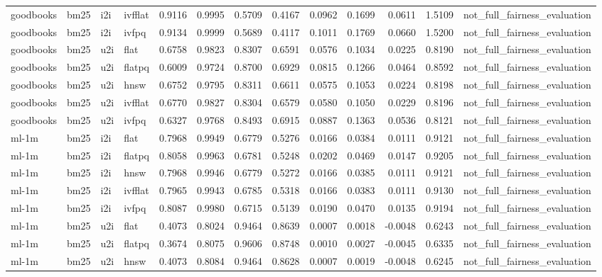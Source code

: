 \begin{tabular}{llllrrrrrrrrl}
goodbooks & bm25 & i2i & ivfflat & 0.9116 & 0.9995 & 0.5709 & 0.4167 & 0.0962 & 0.1699 & 0.0611 & 1.5109 & not_full_fairness_evaluation \\
goodbooks & bm25 & i2i & ivfpq & 0.9134 & 0.9999 & 0.5689 & 0.4117 & 0.1011 & 0.1769 & 0.0660 & 1.5200 & not_full_fairness_evaluation \\
goodbooks & bm25 & u2i & flat & 0.6758 & 0.9823 & 0.8307 & 0.6591 & 0.0576 & 0.1034 & 0.0225 & 0.8190 & not_full_fairness_evaluation \\
goodbooks & bm25 & u2i & flatpq & 0.6009 & 0.9724 & 0.8700 & 0.6929 & 0.0815 & 0.1266 & 0.0464 & 0.8592 & not_full_fairness_evaluation \\
goodbooks & bm25 & u2i & hnsw & 0.6752 & 0.9795 & 0.8311 & 0.6611 & 0.0575 & 0.1053 & 0.0224 & 0.8198 & not_full_fairness_evaluation \\
goodbooks & bm25 & u2i & ivfflat & 0.6770 & 0.9827 & 0.8304 & 0.6579 & 0.0580 & 0.1050 & 0.0229 & 0.8196 & not_full_fairness_evaluation \\
goodbooks & bm25 & u2i & ivfpq & 0.6327 & 0.9768 & 0.8493 & 0.6915 & 0.0887 & 0.1363 & 0.0536 & 0.8121 & not_full_fairness_evaluation \\
ml-1m & bm25 & i2i & flat & 0.7968 & 0.9949 & 0.6779 & 0.5276 & 0.0166 & 0.0384 & 0.0111 & 0.9121 & not_full_fairness_evaluation \\
ml-1m & bm25 & i2i & flatpq & 0.8058 & 0.9963 & 0.6781 & 0.5248 & 0.0202 & 0.0469 & 0.0147 & 0.9205 & not_full_fairness_evaluation \\
ml-1m & bm25 & i2i & hnsw & 0.7968 & 0.9946 & 0.6779 & 0.5272 & 0.0166 & 0.0385 & 0.0111 & 0.9121 & not_full_fairness_evaluation \\
ml-1m & bm25 & i2i & ivfflat & 0.7965 & 0.9943 & 0.6785 & 0.5318 & 0.0166 & 0.0383 & 0.0111 & 0.9130 & not_full_fairness_evaluation \\
ml-1m & bm25 & i2i & ivfpq & 0.8087 & 0.9980 & 0.6715 & 0.5139 & 0.0190 & 0.0470 & 0.0135 & 0.9194 & not_full_fairness_evaluation \\
ml-1m & bm25 & u2i & flat & 0.4073 & 0.8024 & 0.9464 & 0.8639 & 0.0007 & 0.0018 & -0.0048 & 0.6243 & not_full_fairness_evaluation \\
ml-1m & bm25 & u2i & flatpq & 0.3674 & 0.8075 & 0.9606 & 0.8748 & 0.0010 & 0.0027 & -0.0045 & 0.6335 & not_full_fairness_evaluation \\
ml-1m & bm25 & u2i & hnsw & 0.4073 & 0.8084 & 0.9464 & 0.8628 & 0.0007 & 0.0019 & -0.0048 & 0.6245 & not_full_fairness_evaluation \\

\end{tabular}
